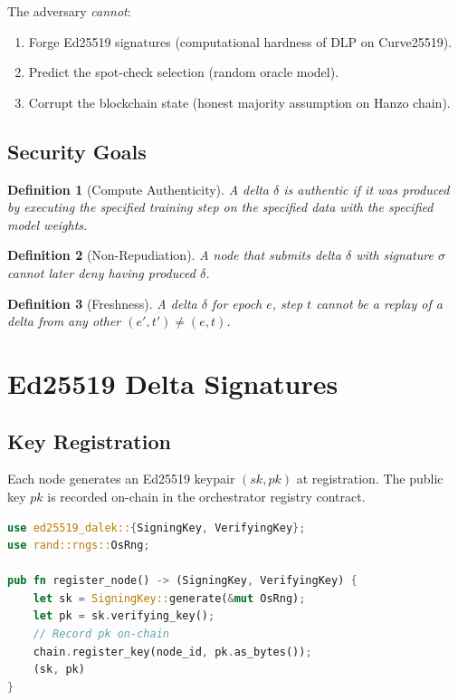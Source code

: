 \documentclass[11pt,letterpaper]{article}
\newtheorem{definition}{Definition}[section]
\begin{document}
The adversary \textit{cannot}:

\begin{enumerate}
    \item Forge Ed25519 signatures (computational hardness of DLP on Curve25519).
    \item Predict the spot-check selection (random oracle model).
    \item Corrupt the blockchain state (honest majority assumption on Hanzo chain).
\end{enumerate}

\subsection{Security Goals}

\begin{definition}[Compute Authenticity]
A delta $\delta$ is \textit{authentic} if it was produced by executing the specified training step on the specified data with the specified model weights.
\end{definition}

\begin{definition}[Non-Repudiation]
A node that submits delta $\delta$ with signature $\sigma$ cannot later deny having produced $\delta$.
\end{definition}

\begin{definition}[Freshness]
A delta $\delta$ for epoch $e$, step $t$ cannot be a replay of a delta from any other $(e', t') \neq (e, t)$.
\end{definition}

\section{Ed25519 Delta Signatures}
\label{sec:signatures}

\subsection{Key Registration}

Each node generates an Ed25519 keypair $(sk, pk)$ at registration.  The public key $pk$ is recorded on-chain in the orchestrator registry contract.

\begin{lstlisting}[language=Rust,caption=Key generation and registration]
use ed25519_dalek::{SigningKey, VerifyingKey};
use rand::rngs::OsRng;

pub fn register_node() -> (SigningKey, VerifyingKey) {
    let sk = SigningKey::generate(&mut OsRng);
    let pk = sk.verifying_key();
    // Record pk on-chain
    chain.register_key(node_id, pk.as_bytes());
    (sk, pk)
}
\end{lstlisting}
\end{document}
